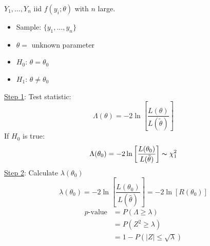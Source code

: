 $ Y_1,\ldots ,Y_n $ iid $ f(y_i;\theta) $ with $ n $ large.
\begin{itemize}
    \item Sample: $ \{y_1,\ldots ,y_n\} $
    \item $ \theta= $ unknown parameter
    \item $ H_0 $: $ \theta=\theta_0 $
    \item $ H_1 $: $ \theta\neq\theta_0 $
\end{itemize}
\underline{Step 1}: Test statistic:
\[ \Lambda(\theta)=-2\ln\left[ \frac{L(\theta)}{L(\tilde{\theta})}  \right] \]
If $ H_0 $ is true:
\[ \Lambda(\theta_0)=-2\ln\left[ \frac{L(\theta_0)}{L(\tilde{\theta})}  \right]
    \thicksim \chi^2_{1} \]
\underline{Step 2}: Calculate $ \lambda(\theta_0) $
\[ \lambda(\theta_0)=-2\ln\left[ \frac{L(\theta_0)}{L(\hat{\theta})}  \right]=-2\ln
    \left[ R(\theta_0) \right] \]
\begin{align*}
    p\text{-value}
     & =P(\Lambda\geqslant \lambda)      \\
     & =P(Z^2\geqslant \lambda)          \\
     & =1-P(|Z|\leqslant \sqrt{\lambda})
\end{align*}

